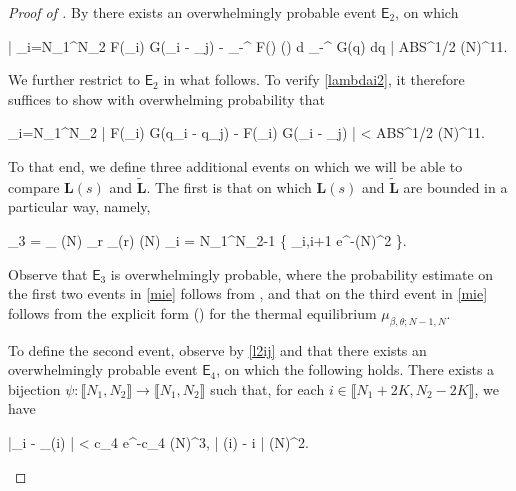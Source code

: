 \documentclass{amsart}
\numberwithin{equation}{section}
\theoremstyle{remark}
\theoremstyle{definition}
\begin{document}
\begin{proof}[Proof of ]
		By  there exists an overwhelmingly probable event $\mathsf{E}_2$, on which 
		\begin{flalign*}
			\Bigg| \displaystyle\sum_{i=N_1}^{N_2} F(\tilde{\Lambda}_i) \cdot G(\tilde{q}_i - _j) - \displaystyle\int_{-\infty}^{\infty} F(\lambda) \varrho (\lambda) d \lambda \displaystyle\int_{-\infty}^{\infty} G(\alpha q) dq \Bigg|  ABS^{1/2} (\log N)^{11}.
		\end{flalign*}
		
		\noindent We further restrict to $\mathsf{E}_2$ in what follows. To verify \eqref{lambdai2}, it therefore suffices to show with overwhelming probability that 
		\begin{flalign}
			\label{flambda2} 
			 \displaystyle\sum_{i=N_1}^{N_2} \big| F(\Lambda_i) \cdot G(q_i - q_j) - F(\tilde{\Lambda}_i) \cdot G(\tilde{q}_i - _j) \big| < ABS^{1/2} (\log N)^{11}.
		\end{flalign}
		
		To that end, we define three additional events on which we will be able to compare $\bm{L}(s)$ and $\tilde{\bm{L}}$. The first is that on which $\bm{L}(s)$ and $\tilde{\bm{L}}$ are bounded in a particular way, namely, 
		\begin{flalign}
			\label{mie} 
				_3 = _{} (\log N) \cap \bigcap_{r } _{(r)} (\log N) \cap \bigcap_{i = N_1}^{N_2-1} \{ _{i,i+1} \ge e^{-(\log N)^2} \}.
		\end{flalign} 
		
		\noindent Observe that $\mathsf{E}_3$ is overwhelmingly probable, where the probability estimate on the first two events in \eqref{mie} follows from , and that on the third event in \eqref{mie} follows from the explicit form () for the thermal equilibrium $\mu_{\beta,\theta;N-1,N}$.
		
		To define the second event, observe by \eqref{l2ij} and  that there exists an overwhelmingly probable event $\mathsf{E}_4$, on which the following holds. There exists a bijection $\psi : \llbracket N_1, N_2 \rrbracket \rightarrow \llbracket N_1, N_2 \rrbracket$ such that, for each $i \in \llbracket N_1 + 2K, N_2 - 2 K  \rrbracket$, we have 
		\begin{flalign}
			\label{lambda2psi} 
			|\Lambda_i - \tilde{\Lambda}_{\psi(i)} | < c_4 e^{-c_4 (\log N)^3}, \qquad {} \qquad | \psi(i) - i | \le (\log N)^2. 
		\end{flalign} 
		

\end{proof}
\end{document}

